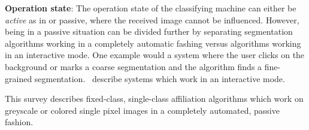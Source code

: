 \textbf{Operation state}: The operation state of the classifying machine can
either be \textit{active} as in
\cite{schiebener2011segmentation,schiebener2012discovery} or passive, where the
received image cannot be influenced. However, being in a passive situation can
be divided further by separating segmentation algorithms working in a
completely automatic fashing versus algorithms working in an interactive mode.
One example would a system where the user clicks on the background or marks a
coarse segmentation and the algorithm finds a fine-grained segmentation.
\cite{boykov2000interactive,rother2004grabcut,protiere2007interactive}~describe
systems which work in an interactive mode.

This survey describes fixed-class, single-class affiliation algorithms which
work on greyscale or colored single pixel images in a completely automated,
passive fashion.
